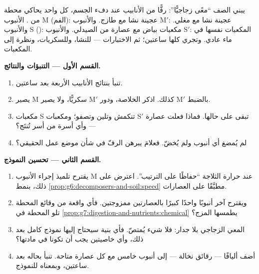 \begin{problem}\label{pb:g7:digestion-and-nutrients:1}
يبني الصف ``معًى زجاجيًّا'': رفًّا من الأنابيب عند دفء الجسم، كل
واحد يحاكي محطة من . الأنبوب M (الفم): عجينة نشا مع
 طازج. والأنبوب M$'$: عجينة نشا مع  مغلي. والأنبوب S
(): مكعبات بياض  مع عصارة  من الصيدلي. والأنبوب
S$'$: المكعبات نفسها في ماء عادي. وتجري كلها ساعتين؛ ثم
الاختبارات --- للنشا، وللسكريات، ونظرة إلى المكعبات.

\medskip\noindent\textbf{القسم الأول --- التنبؤات
والنتائج.}
\begin{enumerate}
  \item تنبأ بنتائج الأنابيب الأربعة بعد ساعتين.
  \item يصير M سكريًّا، ولا يصير M$'$ كذلك. اذكر الخلاصة، ودور
        M$'$ بالضبط.
  \item مكعبات S تنكمش وتلين وتصفو؛ ومكعبات S$'$ تبقى على
        حالها. فماذا فعلت عصارة  --- وأي أسرة من أسر
         تُنتَج؟
  \item لم يُمضغ أي أنبوب ولم يُخضّ. فعلامَ يبرهن الرفّ في شأن
        موضع عمل  الحقيقي؟
\end{enumerate}

\medskip\noindent\textbf{القسم الثاني --- تحسين النموذج.}
\begin{enumerate}[resume]
  \item يقترح تلميذ إجراء الأنبوب M عند حرارة الثلاجة ``حفاظًا
        على الترتيب''. اعترض على ذلك، بنمط
        \cref{prop:g6:decomposers-and-soil:speed} مطبَّقًا على
        العصارات.
  \item ويقترح آخر أنبوبًا واحدًا كبيرًا بالعصارتين ممزوجتين.
        فأي واقعة من وقائع المحطة تلو المحطة في
        \cref{prop:g7:digestion-and-nutrients:chemical} يطمسها
        المزج؟
  \item المعي الزجاجي بلا جدار: فلا شيء يُمتصّ. فأي بنية سيحتاج
        إليها نموذج كامل بعد ذلك، وأي خاصيتين يجب أن تكونا في
        مادتها؟
  \item أضف أليافًا --- رقائق نخالة --- إلى أنبوب خامس مع كل
        عصارة متاحة. تنبأ بحاله بعد ساعتين، وبمعناه للنموذج.
\end{enumerate}


\end{problem}
